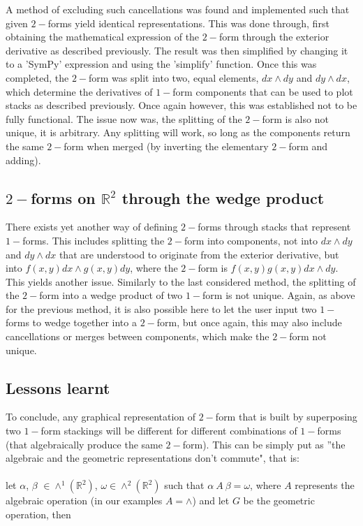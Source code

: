 \documentclass[12pt]{report}
\begin{document}
A method of excluding such cancellations was found and implemented such that given $2-$forms yield identical representations. This was done through, first obtaining the mathematical expression of the $2-$form through the exterior derivative as described previously. The result was then simplified by changing it to a 'SymPy' expression and using the 'simplify' function. Once this was completed, the $2-$form was split into two, equal elements, $dx \wedge dy$ and $dy\wedge dx$, which determine the derivatives of $1-$form components that can be used to plot stacks as described previously.
Once again however, this was established not to be fully functional. The issue now was, the splitting of the $2-$form is also not unique, it is arbitrary. Any splitting will work, so long as the components return the same $2-$form when merged (by inverting the elementary $2-$form and adding).


\subsection{$2-$forms on $\mathbb{R}^2$ through the wedge product}
There exists yet another way of defining $2-$forms through stacks that represent $1-$forms. This includes splitting the $2-$form into components, not into $dx\wedge dy$ and $dy\wedge dx$ that are understood to originate from the exterior derivative, but into $f(x, y)dx \wedge g(x, y)dy$, where the $2-$form is $f(x,y)g(x,y) dx\wedge dy$. This yields another issue. Similarly to the last considered method, the splitting of the $2-$form into a wedge product of two $1-$form is not unique. Again, as above for the previous method, it is also possible here to let the user input two $1-$forms to wedge together into a $2-$form, but once again, this may also include cancellations or merges between components, which make the $2-$form not unique.

\subsection{Lessons learnt}
To conclude, any graphical representation of  $2-$form that is built by superposing two $1-$form stackings will be different for different combinations of $1-$forms (that algebraically produce the same $2-$form). This can be simply put as ''the algebraic and the geometric representations don't commute", that is: \\~\\
let $\alpha$, $\beta$  $\in \wedge^1(\mathbb{R}^2)$, $\omega \in \wedge^2(\mathbb{R}^2)$ such that $\alpha~A~\beta = \omega$, where $A$ represents the algebraic operation (in our examples $A=\wedge$)  and let $G$ be the geometric operation, then 
\end{document}
